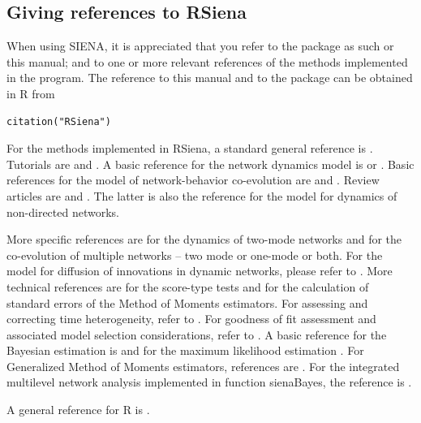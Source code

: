 \documentclass[a4paper,fleqn,11pt]{article}
\newcommand{\+}{\, + \,}
\newcommand{\sfn}[1]{\textsf{#1}}
\newcommand{\R}{{\sf R }}
\newcommand{\rs}{{\sf RSiena}}
\newcommand{\si}{{\sf SIENA}}
\begin{document}
\newpage

\newpage

\subsection{Giving references to RSiena}

When using \si, it is appreciated that you refer to the package as such
or this manual; and to one or
more relevant references of the methods implemented in the program.  The
reference to this manual and to the package can be obtained in \R from
\begin{verbatim}
citation("RSiena")
\end{verbatim}

For the methods implemented in \rs,
a standard general reference is \citet{Snijders2017}.
Tutorials are \citet*{SnijdersEA10b} and \citet{Kalish2020}.
A basic reference for the network dynamics model is \citet{Snijders01}
or \citet{Snijders05}.
Basic references for the model of network-behavior co-evolution
are \citet*{SnijdersEA07} and \citet*{SteglichEA10}.
Review articles are \citet{Snijders2017} and \citet{SnijdersPickup17}.
The latter is also the reference for the model for dynamics
of non-directed networks.

More specific references are \citet{KoskinenEdling2012} for the
dynamics of two-mode networks and \citet{SLT2013} for the
co-evolution of multiple networks -- two mode or one-mode or both.
For the model for diffusion of innovations in dynamic networks,
please refer to \citet{Greenan15}.
More technical references are
\citet{Schweinberger12} for the score-type tests
and \citet{SchweinbergerSnijders07a} for the calculation of
standard errors of the Method of Moments estimators.
For assessing and correcting time heterogeneity, refer to
\citet*{Lospinoso2011}.
For goodness of fit assessment and associated model
selection considerations, refer to \citet{LospinosoSnijders2019}.
A basic reference for the Bayesian estimation is \citet{KoskinenSnijders07}
and for the maximum likelihood estimation \citet*{SnijdersEA10a}.
For Generalized Method of Moments estimators,
references are \citet*{ASS2015,ASS2019}.
For the integrated multilevel network analysis implemented
in function \sfn{sienaBayes}, the reference is \citet{KoskinenSnijders2023}.
\smallskip

A general reference for \R is \citet{R}.
\end{document}
